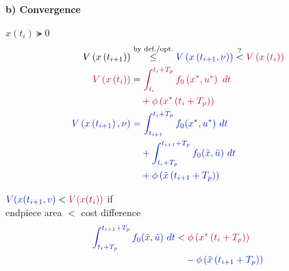 \paragraph{b) Convergence} $x(t_i) \lat{} 0$
\def\colRed{\color[rgb]{0.725,0.047,0.278}}
\def\colBlue{\color[rgb]{0.047,0.133,0.725}}
\def\colPurple{\color[rgb]{0.633, 0.064, 0.658}}
\begin{align*}
    V \paren{ x \paren{ t_{i+1} } }
    &\overtext{by def./opt.}{\leq} 
    {\colBlue
        V \paren{ x \paren{ t_{i+1}, \nu } }
    }
    \overset{?}{<}
    \colRed V \paren{ x \paren{ t_i } }\\
    \colRed V \paren{ x\paren{ t_i } }
    &= \colRed \intdt{t_i}{t_i + T_p}{
        f_0 \paren{ x^*, u^* }
        }\\
        &
        \colRed \quad
        + \phi \paren{
            x^*\paren{ t_i + T_p }
            }\\
    \colBlue V \paren{ x\paren{t_{i+1}}, \nu } & \colBlue =
        \intdt{t_{i+1}}{t_i + T_p}{
        f_0(x^*,u^*)
        } \\
        & \colBlue \quad + \intdt{t_i + T_p}{t_{i+1}+T_p}{ f_0 (\tilde{x}, \tilde{u}) }\\
        & \colBlue \quad + \phi \paren{ \tilde{x} \paren{ t_{i+1} + T_p } }
\end{align*}

\begin{figure}[H]
    \centering
\end{figure}

${\colBlue V(x(t_{i+1}, v) } <
{\colRed V(x(t_i)) }$ if\\
endpiece area $<$ cost difference
\begin{align*}
    {\colBlue \intdt{t_i + T_p}{t_{i+1}+T_p}{ f_0 (\tilde{x}, \tilde{u}) } }
    &<
    {\colRed \phi \paren{ x^* \paren{ t_{i} + T_p } } }\\
    & \quad -
    {\colBlue
        \phi \paren{ \tilde{x} \paren{ t_{i+1} + T_p } }
    }
\end{align*}

